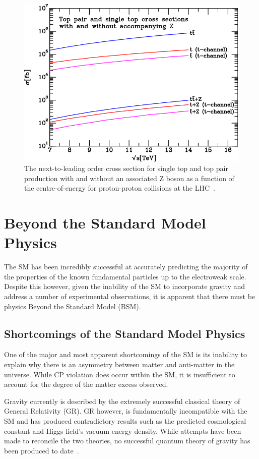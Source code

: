 \begin{figure}[h]
\centering
\includegraphics[width=\textwidth]{figs/top-physics/TplusZtot.png}
\caption{The next-to-leading order cross section for single top and top pair production with and without an associated Z boson as a function of the centre-of-energy for proton-proton collisions at the LHC~\cite{Campbell:2013yla}.
}
\label{fig:topZcrossSections}
\end{figure}

\section{Beyond the Standard Model Physics}\label{sec:bsm}
The SM has been incredibly successful at accurately predicting the majority of the properties of the known fundamental particles up to the electroweak scale.
Despite this however, given the inability of the SM to incorporate gravity and address a number of experimental observations, it is apparent that there must be physics Beyond the Standard Model (BSM).

\subsection{Shortcomings of the Standard Model Physics}\label{subsec:shortcomings}
One of the major and most apparent shortcomings of the SM is its inability to explain why there is an asymmetry between matter and anti-matter in the universe.
While CP violation does occur within the SM, it is insufficient to account for the degree of the matter excess observed.

Gravity currently is described by the extremely successful classical theory of General Relativity (GR).
GR however, is fundamentally incompatible with the SM and  has produced contradictory results such as the predicted cosmological constant and Higgs field's vacuum energy density.
While attempts have been made to reconcile the two theories, no successful quantum theory of gravity has been produced to date~\cite{Sola:2013gha}.	


